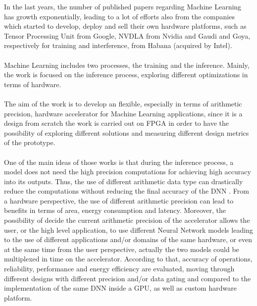 In the last years, the number of published papers regarding Machine Learning has growth exponentially, leading to a lot of efforts also from the companies which started to develop, deploy and sell their own hardware platforms, such as Tensor Processing Unit \cite{paper:40} from Google, NVDLA\cite{WEBSITE:6} from Nvidia and Gaudi \cite{paper:39} and Goya\cite{paper:38}, respectively for training and interference, from Habana (acquired by Intel).\\\\
Machine Learning includes two processes, the training and the inference. Mainly, the work is focused on the inference process, exploring different optimizations in terms of hardware.\\\\The aim of the work is to develop an flexible, especially in terms of arithmetic precision, hardware accelerator for Machine Learning applications, since it is a design from scratch the work is carried out on FPGA in order to have the possibility of exploring different solutions and measuring different design metrics of the prototype.\\\\
One of the main ideas of those works is that during the inference process, a model does not need the high precision computations \cite{paper:8} \cite{paper:15}for achieving high accuracy into its outputs. Thus, the use of different arithmetic data type can drastically reduce the computations without reducing the final accuracy of the DNN \cite{paper:7} \cite{paper:8}. From a hardware perspective,  the use of different arithmetic precision\cite{paper:14} can lead to benefits in terms of area, energy consumption and latency. Moreover, the possibility of decide the current arithmetic precision of the accelerator allows the user, or the high level application, to use different Neural Network models leading to the use of different  applications and/or domains of the same hardware, or even at the same time from the user perspective, actually the two models could be multiplexed in time on the accelerator.\newline
According to that, accuracy of operations, reliability, performance and energy efficiency are evaluated, moving through different designs with different precision and/or data gating and compared to the implementation of the same DNN inside a GPU, as well as custom hardware platform.

